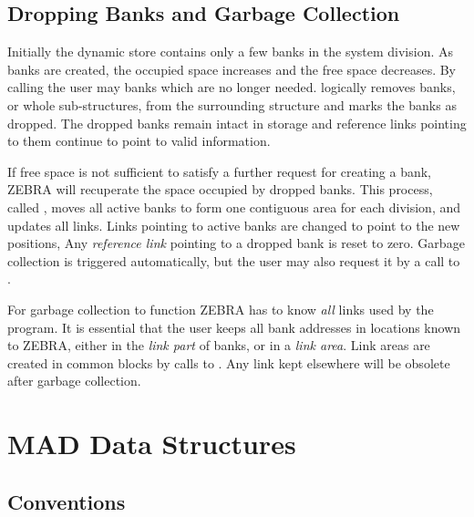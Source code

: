 \section{Dropping Banks and Garbage Collection}
\label{Sdrop}
Initially the dynamic store contains only a few banks in the
system division.
As banks are created,
the occupied space increases and the free space decreases.
By calling  the user may  banks
which are no longer needed.
 logically removes banks, or whole sub-structures,
from the surrounding structure and marks the banks as dropped.
The dropped banks remain intact in storage and reference links
pointing to them continue to point to valid information.
 
If free space is not sufficient to satisfy a further request
for creating a bank,
ZEBRA will recuperate the space occupied by dropped banks.
This process, called ,
moves all active banks to form one contiguous area for each division,
and updates all links.
Links pointing to active banks are changed to point to the
new positions,
Any {\em reference link} pointing to a
dropped bank is reset to zero.
Garbage collection is triggered automatically,
but the user may also request it by a call to .
 
For garbage collection to function ZEBRA has to know {\em all}
links used by the program.
It is essential that the user keeps all bank addresses in
locations known to ZEBRA, either in the {\em link part}
 of banks,
or in a {\em link area}.
Link areas are created in common blocks by calls to .
Any link kept elsewhere will be obsolete after garbage collection.


\chapter{MAD Data Structures}
\section{Conventions}
\label{Sconv}
 
